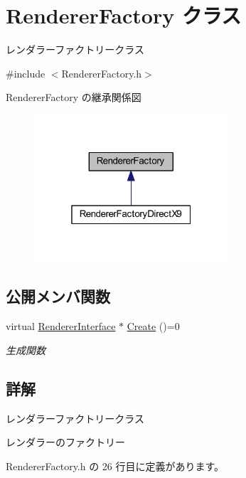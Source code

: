 \hypertarget{class_renderer_factory}{}\section{Renderer\+Factory クラス}
\label{class_renderer_factory}


レンダラーファクトリークラス  




{\ttfamily \#include $<$Renderer\+Factory.\+h$>$}



Renderer\+Factory の継承関係図\nopagebreak
\begin{figure}[H]
\begin{center}
\leavevmode
\includegraphics[width=205pt]{class_renderer_factory__inherit__graph}
\end{center}
\end{figure}
\subsection*{公開メンバ関数}
\begin{DoxyCompactItemize}
\item 
virtual \mbox{\hyperlink{class_renderer_interface}{Renderer\+Interface}} $\ast$ \mbox{\hyperlink{class_renderer_factory_a1907fb4787bf1abdf48443c1e87c0f13}{Create}} ()=0
\begin{DoxyCompactList}\small\item\em 生成関数 \end{DoxyCompactList}\end{DoxyCompactItemize}


\subsection{詳解}
レンダラーファクトリークラス 

レンダラーのファクトリー 

 Renderer\+Factory.\+h の 26 行目に定義があります。



